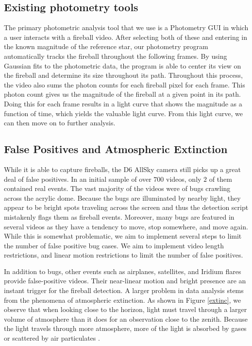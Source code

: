 \subsection{Existing photometry tools}
The primary photometric analysis tool that we use is a Photometry GUI in which a user interacts with a fireball video.
After selecting both of these and entering in the known magnitude of the reference star, our photometry program automatically tracks the fireball throughout the following frames.
By using Gaussian fits to the photometric data, the program is able to center its view on the fireball and determine its size throughout its path.
Throughout this process, the video also sums the photon counts for each fireball pixel for each frame.
This photon count gives us the magnitude of the fireball at a given point in its path.
Doing this for each frame results in a light curve that shows the magnitude as a function of time, which yields the valuable light curve.
From this light curve, we can then move on to further analysis.

\subsection{False Positives and Atmospheric Extinction}

While it is able to capture fireballs, the D6 AllSky camera still picks up a great deal of false positives.
In an initial sample of over $700$ videos, only $2$ of them contained real events.
The vast majority of the videos were of bugs crawling across the acrylic dome.
Because the bugs are illuminated by nearby light, they appear to be bright spots traveling across the screen and thus the detection script mistakenly flags them as fireball events.
Moreover, many bugs are featured in several videos as they have a tendency to move, stop somewhere, and move again.
While this is somewhat problematic, we aim to implement several steps to limit the number of false positive bug cases.
We aim to implement video length restrictions, and linear motion restrictions to limit the number of false positives.

In addition to bugs, other events such as airplanes, satellites, and Iridium flares provide false-positive videos.
Their near-linear motion and bright presence are an instant trigger for the fireball detection.
A larger problem in data analysis stems from the phenomena of atmospheric extinction.
As shown in Figure \ref{extinc}, we observe that when looking close to the horizon, light must travel through a larger volume of atmosphere than it does for an observation close to the zenith.  
Because the light travels through more atmosphere, more of the light is absorbed by gases or scattered by air particulates \cite{hughes_atmospheric_2016}.


